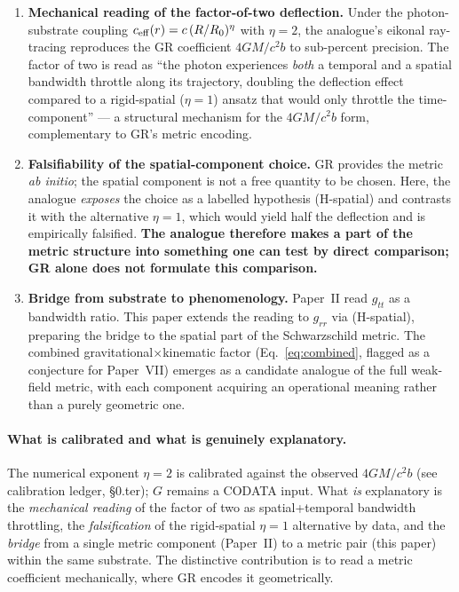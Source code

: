 \documentclass[11pt,a4paper]{article}
\begin{document}
\begin{enumerate}
\item \textbf{Mechanical reading of the factor-of-two
deflection.} Under the photon-substrate coupling
$c_{\rm eff}(r) = c\,(R/R_0)^\eta$ with $\eta = 2$, the
analogue's eikonal ray-tracing reproduces the GR coefficient
$4GM/c^2 b$ to sub-percent precision. The factor of two is
read as ``the photon experiences \emph{both} a temporal and a
spatial bandwidth throttle along its trajectory, doubling the
deflection effect compared to a rigid-spatial ($\eta = 1$)
ansatz that would only throttle the time-component'' --- a
structural mechanism for the $4GM/c^2b$ form, complementary to
GR's metric encoding.

\item \textbf{Falsifiability of the spatial-component choice.}
GR provides the metric \emph{ab initio}; the spatial component
is not a free quantity to be chosen. Here, the analogue
\emph{exposes} the choice as a labelled hypothesis (H-spatial)
and contrasts it with the alternative $\eta = 1$, which would
yield half the deflection and is empirically falsified.
\textbf{The analogue therefore makes a part of the metric
structure into something one can test by direct comparison;
GR alone does not formulate this comparison.}

\item \textbf{Bridge from substrate to phenomenology.} Paper~II
read $g_{tt}$ as a bandwidth ratio. This paper extends the
reading to $g_{rr}$ via (H-spatial), preparing the bridge to
the spatial part of the Schwarzschild metric. The combined
gravitational$\times$kinematic factor (Eq.~\eqref{eq:combined},
flagged as a conjecture for Paper~VII) emerges as a candidate
analogue of the full weak-field metric, with each component
acquiring an operational meaning rather than a purely
geometric one.
\end{enumerate}

\paragraph{What is calibrated and what is genuinely
explanatory.} The numerical exponent $\eta = 2$ is calibrated
against the observed $4GM/c^2 b$ (see calibration ledger,
§0.ter); $G$ remains a CODATA input. What \emph{is} explanatory
is the \emph{mechanical reading} of the factor of two as
spatial+temporal bandwidth throttling, the \emph{falsification}
of the rigid-spatial $\eta = 1$ alternative by data, and the
\emph{bridge} from a single metric component (Paper~II) to a
metric pair (this paper) within the same substrate. The
distinctive contribution is to read a metric coefficient
mechanically, where GR encodes it geometrically.
\end{document}
